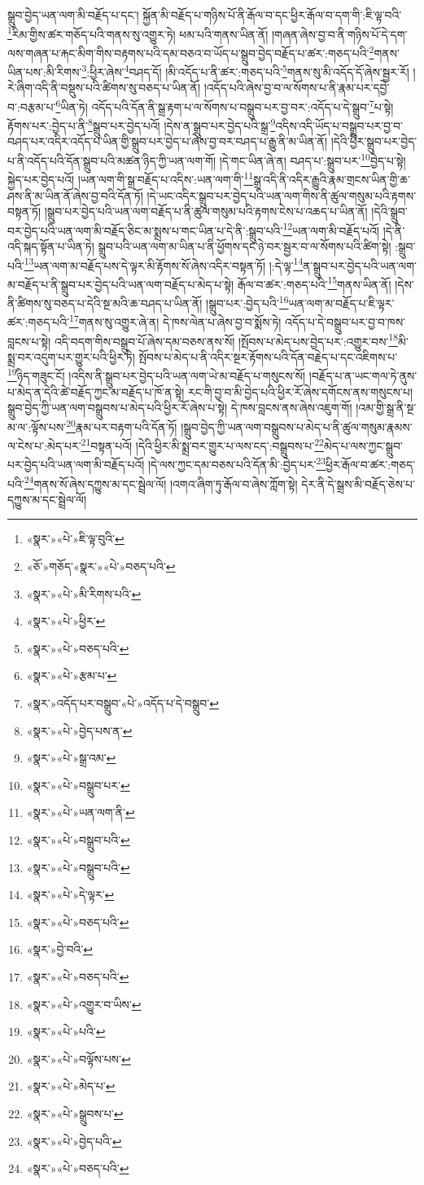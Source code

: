 སྒྲུབ་བྱེད་ཡན་ལག་མི་བརྗོད་པ་དང་། སྐྱོན་མི་བརྗོད་པ་གཉིས་པོ་ནི་རྒོལ་བ་དང་ཕྱིར་རྒོལ་བ་དག་གི་:ཇི་ལྟ་བའི་\footnote{«སྣར་»«པེ་»ཇི་ལྟ་བུའི་}རིམ་གྱིས་ཚར་གཅོད་པའི་གནས་སུ་འགྱུར་ཏེ། ཕམ་པའི་གནས་ཡིན་ནོ། །གཞན་ཞེས་བྱ་བ་ནི་གཉིས་པོ་དེ་དག་ལས་གཞན་པ་རྐང་མིག་གིས་བརྟགས་པའི་དམ་བཅའ་བ་ཡོད་པ་སྒྲུབ་བྱེད་བརྗོད་པ་ཚར་:གཅད་པའི་\footnote{«ཅོ་»གཅོད་«སྣར་»«པེ་»བཅད་པའི་}གནས་ཡིན་པས་:མི་རིགས་\footnote{«སྣར་»«པེ་»མི་རིགས་པའི་}:ཕྱིར་ཞེས་\footnote{«སྣར་»«པེ་»ཕྱིར་}བཤད་དོ། །མི་འདོད་པ་ནི་ཚར་:གཅད་པའི་\footnote{«སྣར་»«པེ་»བཅད་པའི་}གནས་སུ་མི་འདོད་དོ་ཞེས་སྦྱར་རོ། །རེ་ཞིག་འདི་ནི་བསྡུས་པའི་ཚིགས་སུ་བཅད་པ་ཡིན་ནོ། །འདོད་པའི་ཞེས་བྱ་བ་ལ་སོགས་པ་ནི་རྣམ་པར་དབྱེ་བ་:བརྩམ་པ་\footnote{«སྣར་»«པེ་»རྩམ་པ་}ཡིན་ཏེ། འདོད་པའི་དོན་ནི་སྒྲ་རྟག་པ་ལ་སོགས་པ་བསྒྲུབ་པར་བྱ་བར་:འདོད་པ་དེ་སྒྲུབ་\footnote{«སྣར་»འདོད་པར་བསྒྲུབ་«པེ་»འདོད་པ་དེ་བསྒྲུབ་}པ་སྟེ། རྟོགས་པར་:བྱེད་པ་ནི་\footnote{«སྣར་»«པེ་»བྱེད་པས་ན་}སྒྲུབ་པར་བྱེད་པའོ། །དེས་ན་སྒྲུབ་པར་བྱེད་པའི་སྒྲ་\footnote{«སྣར་»«པེ་»སྒྲ་འམ་}འདིས་འདི་ཡོད་པ་བསྒྲུབ་པར་བྱ་བ་བཤད་པར་འདིར་འདོད་པ་ཡིན་གྱི་སྒྲུབ་པར་བྱེད་པ་ཞེས་བྱ་བར་བཤད་པ་རྒྱུ་ནི་མ་ཡིན་ནོ། །དེའི་ཕྱིར་སྒྲུབ་པར་བྱེད་པ་ནི་འདོད་པའི་དོན་སྒྲུབ་པའི་མཚན་ཉིད་ཀྱི་ཡན་ལག་གོ། །དེ་གང་ཡིན་ཞེ་ན། བཤད་པ་:སྒྲུབ་པར་\footnote{«སྣར་»«པེ་»བསྒྲུབ་པར་}བྱེད་པ་སྟེ། སྐྱེད་པར་བྱེད་པའོ། །ཡན་ལག་གི་སྒྲ་བརྗོད་པ་འདིས་:ཡན་ལག་གི་\footnote{«སྣར་»«པེ་»ཡན་ལག་ནི་}སྒྲ་འདི་ནི་འདིར་རྒྱུའི་རྣམ་གྲངས་ཡིན་གྱི་ཆ་ཤས་ནི་མ་ཡིན་ནོ་ཞེས་བྱ་བའི་དོན་ཏོ། །དེ་ཡང་འདིར་སྒྲུབ་པར་བྱེད་པའི་ཡན་ལག་གིས་ནི་ཚུལ་གསུམ་པའི་རྟགས་བསྟན་ཏོ། །སྒྲུབ་པར་བྱེད་པའི་ཡན་ལག་བརྗོད་པ་ནི་ཚུལ་གསུམ་པའི་རྟགས་ངེས་པ་འཆད་པ་ཡིན་ནོ། །དེའི་སྒྲུབ་བར་བྱེད་པའི་ཡན་ལག་མི་བརྗོད་ཅིང་མ་སྨྲས་པ་གང་ཡིན་པ་དེ་ནི་:སྒྲུབ་པའི་\footnote{«སྣར་»«པེ་»བསྒྲུབ་པའི་}ཡན་ལག་མི་བརྗོད་པའོ། །དེ་ནི་འདི་སྐད་སྟོན་པ་ཡིན་ཏེ། སྒྲུབ་པའི་ཡན་ལག་མ་ཡིན་པ་ནི་ཕྱོགས་དང་ཉེ་བར་སྦྱར་བ་ལ་སོགས་པའི་ཚིག་སྟེ། :སྒྲུབ་པའི་\footnote{«སྣར་»«པེ་»བསྒྲུབ་པའི་}ཡན་ལག་མ་བརྗོད་པས་དེ་ལྟར་མི་རྟོགས་སོ་ཞེས་འདིར་བསྟན་ཏོ། །:དེ་ལྟ་\footnote{«སྣར་»«པེ་»དེ་ལྟར་}ན་སྒྲུབ་པར་བྱེད་པའི་ཡན་ལག་མ་བརྗོད་པ་ནི་སྒྲུབ་པར་བྱེད་པའི་ཡན་ལག་བརྗོད་པ་མེད་པ་སྟེ། རྒོལ་བ་ཚར་:གཅད་པའི་\footnote{«སྣར་»«པེ་»བཅད་པའི་}གནས་ཡིན་ནོ། །དེས་ནི་ཚིགས་སུ་བཅད་པ་དེའི་སྔ་མའི་ཆ་བཤད་པ་ཡིན་ནོ། །སྒྲུབ་པར་:བྱེད་པའི་\footnote{«སྣར་»བྱེ་བའི་}ཡན་ལག་མ་བརྗོད་པ་ཇི་ལྟར་ཚར་:གཅད་པའི་\footnote{«སྣར་»«པེ་»བཅད་པའི་}གནས་སུ་འགྱུར་ཞེ་ན། དེ་ཁས་ལེན་པ་ཞེས་བྱ་བ་སྨོས་ཏེ། འདོད་པ་དེ་བསྒྲུབ་པར་བྱ་བ་ཁས་བླངས་པ་སྟེ། འདི་བདག་གིས་བསྒྲུབ་པོ་ཞེས་དམ་བཅས་ནས་སོ། །སྤོབས་པ་མེད་པས་བྱེད་པར་:འགྱུར་བས་\footnote{«སྣར་»«པེ་»འགྱུར་བ་ཡིས་}མི་སྨྲ་བར་འདུག་པར་གྱུར་པའི་ཕྱིར་ཏེ། སྤོབས་པ་མེད་པ་ནི་འདིར་སྔར་རྟོགས་པའི་དོན་བརྗེད་པ་དང་འཇིགས་པ་\footnote{«སྣར་»«པེ་»པའི་}ཉིད་གཟུང་ངོ། །འདིས་ནི་སྒྲུབ་པར་བྱེད་པའི་ཡན་ལག་ཡེ་མ་བརྗོད་པ་གསུངས་སོ། །བརྗོད་པ་ན་ཡང་གལ་ཏེ་ནུས་པ་མེད་ན་དེའི་ཚེ་བརྗོད་ཀྱང་མ་བརྗོད་པ་ཁོ་ན་སྟེ། རང་གི་བྱ་བ་མི་བྱེད་པའི་ཕྱིར་རོ་ཞེས་དགོངས་ནས་གསུངས་པ། སྒྲུབ་བྱེད་ཀྱི་ཡན་ལག་བསྒྲུབས་པ་མེད་པའི་ཕྱིར་རོ་ཞེས་པ་སྟེ། དེ་ཁས་བླངས་ནས་ཞེས་འཇུག་གོ། །འམ་གྱི་སྒྲ་ནི་སྔ་མ་ལ་:ལྟོས་པས་\footnote{«སྣར་»«པེ་»བལྟོས་པས་}རྣམ་པར་བརྟག་པའི་དོན་ཏོ། །སྒྲུབ་བྱེད་ཀྱི་ཡན་ལག་བསྒྲུབས་པ་མེད་པ་ནི་ཚུལ་གསུམ་རྣམས་ལ་ངེས་པ་:མེད་པར་\footnote{«སྣར་»«པེ་»མེད་པ་}བསྟན་པའོ། །དེའི་ཕྱིར་མི་སྨྲ་བར་གྱུར་པ་ལས་ངད་:བསྒྲུབས་པ་\footnote{«སྣར་»«པེ་»སྒྲུབས་པ་}མེད་པ་ལས་ཀྱང་སྒྲུབ་པར་བྱེད་པའི་ཡན་ལག་མི་བརྗོད་པའོ། །དེ་ལས་ཀྱང་དམ་བཅས་པའི་དོན་མི་:བྱེད་པར་\footnote{«སྣར་»«པེ་»བྱེད་པའི་}ཕྱིར་རྒོལ་བ་ཚར་:གཅད་པའི་\footnote{«སྣར་»«པེ་»བཅད་པའི་}གནས་སོ་ཞེས་དཀྱུས་མ་དང་སྦྲེལ་ལོ། །འགའ་ཞིག་ཏུ་རྒོལ་བ་ཞེས་ཀློག་སྟེ། དེར་ནི་དེ་སྒྲས་མི་བརྗོད་ཅེས་པ་དཀྱུས་མ་དང་སྦྲེལ་ལོ། 